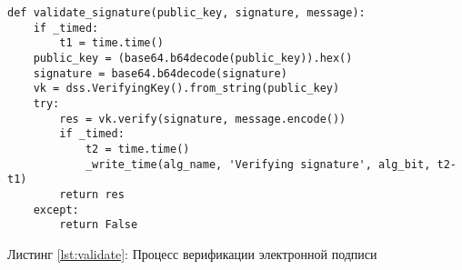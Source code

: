 \begin{center}
\begin{lstlisting}
def validate_signature(public_key, signature, message):
    if _timed:
        t1 = time.time()
    public_key = (base64.b64decode(public_key)).hex()
    signature = base64.b64decode(signature)
    vk = dss.VerifyingKey().from_string(public_key)
    try:
        res = vk.verify(signature, message.encode())
        if _timed:
            t2 = time.time()
            _write_time(alg_name, 'Verifying signature', alg_bit, t2-t1)
        return res
    except:
        return False
\end{lstlisting}\label{lst:validate}
    Листинг \ref{lst:validate}: Процесс верификации электронной подписи
\end{center}
